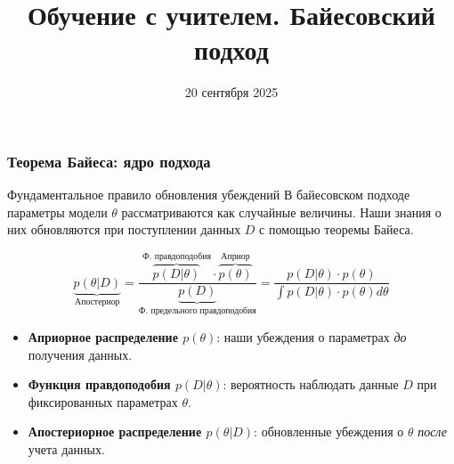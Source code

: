 \documentclass[notheorems, handout]{beamer}
\title[Статистическое и машинное обучение]{Обучение с учителем. Байесовский подход}
\institute[Санкт-Петербургский Государственный Университет]{%
	\small
	Санкт-Петербургский государственный университет\\
	Кафедра статистического моделирования
}
\date{20 сентября 2025}
\begin{document}
\begin{frame}
	\titlepage
\end{frame}

\begin{frame}
  \frametitle{Теорема Байеса: ядро подхода}
  \begin{block}{Фундаментальное правило обновления убеждений}
    В байесовском подходе параметры модели $\theta$ рассматриваются как случайные величины. Наши знания о них обновляются при поступлении данных $D$ с помощью теоремы Байеса.
  \end{block}
  \begin{equation*}
    \underbrace{p(\theta | D)}_{\text{Апостериор}} = \frac{\overbrace{p(D | \theta)}^{\text{Ф. правдоподобия}} \cdot \overbrace{p(\theta)}^{\text{Априор}}}{\underbrace{p(D)}_{\text{Ф. предельного правдоподобия}}} = \frac{p(D | \theta) \cdot p(\theta)}{\int{p(D | \theta) \cdot p(\theta) d\theta}}
  \end{equation*}
  \begin{itemize}
    \item \textbf{Априорное распределение $p(\theta)$}: наши убеждения о параметрах \textit{до} получения данных.
    \item \textbf{Функция правдоподобия $p(D | \theta)$}: вероятность наблюдать данные $D$ при фиксированных параметрах $\theta$.
    \item \textbf{Апостериорное распределение $p(\theta | D)$}: обновленные убеждения о $\theta$ \textit{после} учета данных.
  \end{itemize}
\end{frame}
\end{document}
